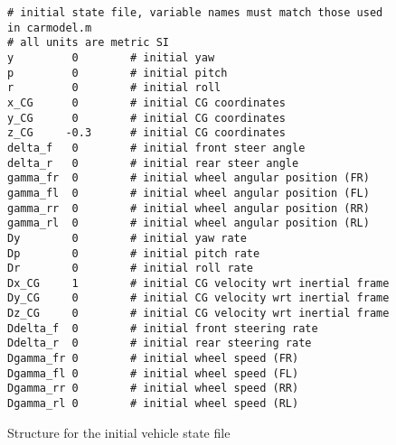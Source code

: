 \begin{figure}[ht]
\begin{Verbatim}
# initial state file, variable names must match those used in carmodel.m
# all units are metric SI
y         0        # initial yaw
p         0        # initial pitch
r         0        # initial roll
x_CG      0        # initial CG coordinates
y_CG      0        # initial CG coordinates
z_CG     -0.3      # initial CG coordinates
delta_f   0        # initial front steer angle
delta_r   0        # initial rear steer angle
gamma_fr  0        # initial wheel angular position (FR)
gamma_fl  0        # initial wheel angular position (FL)
gamma_rr  0        # initial wheel angular position (RR)
gamma_rl  0        # initial wheel angular position (RL)
Dy        0        # initial yaw rate
Dp        0        # initial pitch rate
Dr        0        # initial roll rate
Dx_CG     1        # initial CG velocity wrt inertial frame
Dy_CG     0        # initial CG velocity wrt inertial frame
Dz_CG     0        # initial CG velocity wrt inertial frame
Ddelta_f  0        # initial front steering rate
Ddelta_r  0        # initial rear steering rate
Dgamma_fr 0        # initial wheel speed (FR)
Dgamma_fl 0        # initial wheel speed (FL)
Dgamma_rr 0        # initial wheel speed (RR)
Dgamma_rl 0        # initial wheel speed (RL)
\end{Verbatim}
\caption{Structure for the initial vehicle state file}
\label{init}
\end{figure}
